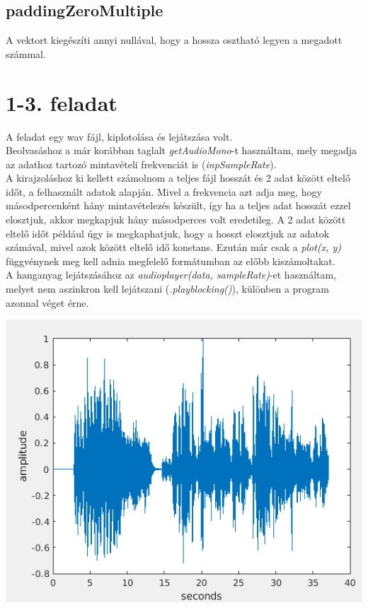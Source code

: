 \documentclass{article}
\begin{document}
	\subsection*{paddingZeroMultiple}
		A vektort kiegészíti annyi nullával, hogy a hossza osztható legyen a megadott számmal.
		

\section*{1-3. feladat}
	A feladat egy wav fájl, kiplotolása és lejátszása volt. \\
	Beolvasáshoz a már korábban taglalt \textit{getAudioMono}-t használtam, mely megadja az adathoz tartozó mintavételi frekvenciát is (\textit{inpSampleRate}). \\
	A kirajzoláshoz ki kellett számolnom a teljes fájl hosszát és 2 adat között eltelő időt, a felhasznált adatok alapján. Mivel a frekvencia azt adja meg, hogy másodpercenként hány mintavételezés készült, így ha a teljes adat hosszát ezzel elosztjuk, akkor megkapjuk hány másodperces volt eredetileg. A 2 adat között eltelő időt például úgy is megkaphatjuk, hogy a hosszt elosztjuk az adatok számával, mivel azok között eltelő idő konstans. Ezután már csak a \textit{plot(x, y)} függvénynek meg kell adnia megfelelő formátumban az előbb kiszámoltakat. \\
	A hanganyag lejátszásához az \textit{audioplayer(data, sampleRate)}-et használtam, melyet nem aszinkron kell lejátszani (\textit{.playblocking()}), különben a program azonnal véget érne.
	
	\begin{center}
		\includegraphics[width=\linewidth/2]{image/1-3.png}
	\end{center}
\end{document}

